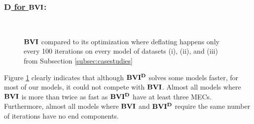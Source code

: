 \subsubsection*{\underline{$\mathbf{D}$ for $\mathbf{BVI}$}:}
\begin{figure}[h!]
    \centering
    \
    \caption{$\mathbf{BVI}$ compared to its optimization where deflating happens only every 100 iterations on every model of datasets (i), (ii), and (iii) from Subsection \ref{subsec:casestudies}}%
    \label{fig:Scatter_D}%
    \end{figure}
Figure \ref{fig:Scatter_D} clearly indicates that although $\mathbf{BVI^D}$ solves some models faster, 
for most of our models, it could not compete with $\mathbf{BVI}$. 
Almost all models where $\mathbf{BVI}$ is more than twice as fast as $\mathbf{BVI^D}$ have at least three MECs.
Furthermore, almost all models where $\mathbf{BVI}$ and $\mathbf{BVI^D}$ require the same number of iterations have no end components.

